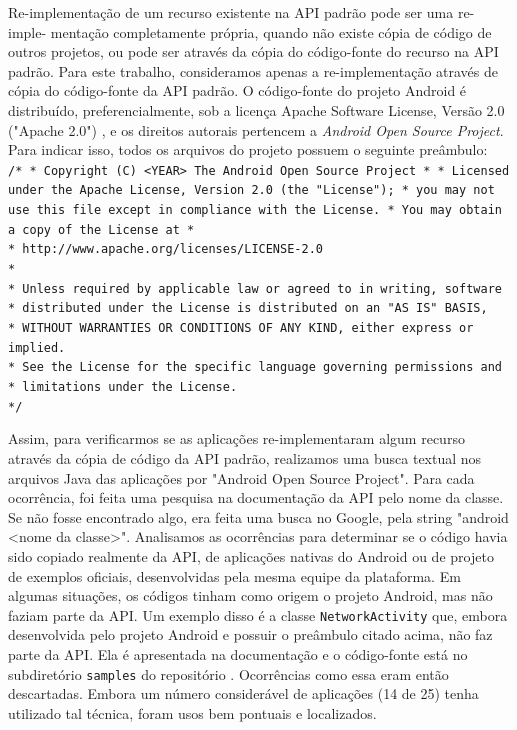 Re-implementação de um recurso existente na API padrão pode ser uma re-imple- mentação
completamente própria, quando não existe cópia de código de outros projetos, ou pode
ser através da cópia do código-fonte do recurso na API padrão. Para este trabalho,
consideramos apenas a re-implementação através de cópia do código-fonte da API padrão.
O código-fonte do projeto Android é distribuído, preferencialmente, sob a licença Apache 
Software License, Versão 2.0 ("Apache 2.0") \cite{License}, e os direitos autorais
pertencem a \textit{Android Open Source Project}. Para indicar isso, todos os arquivos
do projeto possuem o seguinte preâmbulo:
\texttt{
\newline
/* \newline
 * Copyright (C) <YEAR> The Android Open Source Project \newline
 * \newline
 * Licensed under the Apache License, Version 2.0 (the "License"); \newline
 * you may not use this file except in compliance with the License. \newline
 * You may obtain a copy of the License at \newline
 * \\
 *      http://www.apache.org/licenses/LICENSE-2.0 \\
 * \\
 * Unless required by applicable law or agreed to in writing, software \\
 * distributed under the License is distributed on an "AS IS" BASIS, \\
 * WITHOUT WARRANTIES OR CONDITIONS OF ANY KIND, either express or implied. \\
 * See the License for the specific language governing permissions and \\
 * limitations under the License. \\
 */
} 

Assim, para verificarmos se as aplicações re-implementaram algum recurso através
da cópia de código da API padrão, realizamos uma busca textual nos arquivos Java
das aplicações por "Android Open Source Project". Para cada ocorrência, foi feita
uma pesquisa na documentação da API pelo nome da classe. Se não fosse encontrado
algo, era feita uma busca no Google, pela string "android <nome da classe>".
Analisamos as ocorrências  para determinar se o código havia sido copiado realmente
da API, de aplicações nativas do Android ou de projeto de exemplos oficiais,
desenvolvidas pela mesma equipe da plataforma. Em algumas situações, os códigos
tinham como origem o projeto Android, mas não faziam parte da API. Um exemplo disso
é a classe \texttt{NetworkActivity} que, embora desenvolvida pelo projeto Android e
possuir o preâmbulo citado acima, não faz parte da API. Ela é apresentada na
documentação \cite{NetworkUsage} e o código-fonte está no subdiretório \texttt{samples}
do repositório \cite{NetworkActivity}. Ocorrências como essa eram então descartadas.
Embora um número considerável de aplicações (14 de 25) tenha utilizado tal técnica,
foram usos bem pontuais e localizados.

